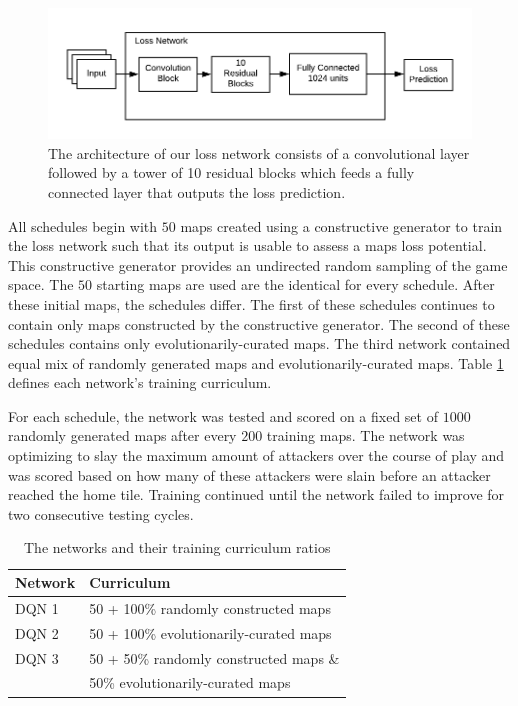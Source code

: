 \documentclass[letterpaper]{article} %
\begin{document}
\begin{figure}[tb]
\begin{center}
\includegraphics[width=1.0\linewidth]{graphics/loss-network.png}
\caption{The architecture of our loss network consists of a convolutional layer followed by a tower of 10 residual blocks which feeds a fully connected layer that outputs the loss prediction.}
\label{fig:loss-network-diagram}
\end{center}
\end{figure}

All schedules begin with $50$ maps created using a constructive generator to train the loss network such that its output is usable to assess a maps loss potential. This constructive generator provides an undirected random sampling of the game space. The $50$ starting maps are used are the identical for every schedule. After these initial maps, the schedules differ. The first of these schedules continues to contain only maps constructed by the constructive generator. The second of these schedules contains only evolutionarily-curated maps. The third network contained equal mix of randomly generated maps and evolutionarily-curated maps. Table \ref{table:networks} defines each network's training curriculum.

For each schedule, the network was tested and scored on a fixed set of $1000$ randomly generated maps after every $200$ training maps. The network was optimizing to slay the maximum amount of attackers over the course of play and was scored based on how many of these attackers were slain before an attacker reached the home tile. Training continued until the network failed to improve for two consecutive testing cycles.

\begin{table}[]
\begin{tabular}{|l|l|}
\hline
\textbf{Network} & \textbf{Curriculum} \\ \hline
DQN 1  & 50 + 100\% randomly constructed maps\\ \hline
DQN 2  & 50 + 100\% evolutionarily-curated maps\\ \hline
DQN 3  & 50 + 50\% randomly constructed maps \& \\ 
       & 50\% evolutionarily-curated maps\\ \hline
\end{tabular}
\caption{The networks and their training curriculum ratios}
\label{table:networks}
\end{table}
\end{document}
